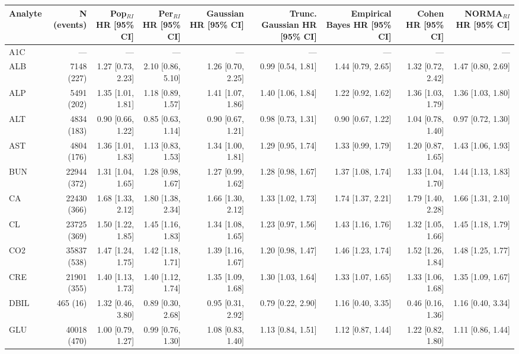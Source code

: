 \begin{table}[ht]
\centering
\footnotesize
\begin{tabular}{lrrrrrrrr}
\toprule
Analyte & N (events) & Pop$_{RI}$ HR [95\% CI] & Per$_{RI}$ HR [95\% CI] & Gaussian HR [95\% CI] & Trunc. Gaussian HR [95\% CI] & Empirical Bayes HR [95\% CI] & Cohen HR [95\% CI] & NORMA$_{RI}$ HR [95\% CI] \\
\midrule
A1C & --- & --- & --- & --- & --- & --- & --- & --- \\
ALB & 7148 (227) & 1.27 [0.73, 2.23] & 2.10 [0.86, 5.10] & 1.26 [0.70, 2.25] & 0.99 [0.54, 1.81] & 1.44 [0.79, 2.65] & 1.32 [0.72, 2.42] & 1.47 [0.80, 2.69] \\
ALP & 5491 (202) & 1.35 [1.01, 1.81] & 1.18 [0.89, 1.57] & 1.41 [1.07, 1.86] & 1.40 [1.06, 1.84] & 1.22 [0.92, 1.62] & 1.36 [1.03, 1.79] & 1.36 [1.03, 1.80] \\
ALT & 4834 (183) & 0.90 [0.66, 1.22] & 0.85 [0.63, 1.14] & 0.90 [0.67, 1.21] & 0.98 [0.73, 1.31] & 0.90 [0.67, 1.22] & 1.04 [0.78, 1.40] & 0.97 [0.72, 1.30] \\
AST & 4804 (176) & 1.36 [1.01, 1.83] & 1.13 [0.83, 1.53] & 1.34 [1.00, 1.81] & 1.29 [0.95, 1.74] & 1.33 [0.99, 1.79] & 1.20 [0.87, 1.65] & 1.43 [1.06, 1.93] \\
BUN & 22944 (372) & 1.31 [1.04, 1.65] & 1.28 [0.98, 1.67] & 1.27 [0.99, 1.62] & 1.28 [0.98, 1.67] & 1.37 [1.08, 1.74] & 1.33 [1.04, 1.70] & 1.44 [1.13, 1.83] \\
CA & 22430 (366) & 1.68 [1.33, 2.12] & 1.80 [1.38, 2.34] & 1.66 [1.30, 2.12] & 1.33 [1.02, 1.73] & 1.74 [1.37, 2.21] & 1.79 [1.40, 2.28] & 1.66 [1.31, 2.10] \\
CL & 23725 (369) & 1.50 [1.22, 1.85] & 1.45 [1.16, 1.83] & 1.34 [1.08, 1.65] & 1.23 [0.97, 1.56] & 1.43 [1.16, 1.76] & 1.32 [1.05, 1.66] & 1.45 [1.18, 1.79] \\
CO2 & 35837 (538) & 1.47 [1.24, 1.75] & 1.42 [1.18, 1.71] & 1.39 [1.16, 1.67] & 1.20 [0.98, 1.47] & 1.46 [1.23, 1.74] & 1.52 [1.26, 1.84] & 1.48 [1.25, 1.77] \\
CRE & 21901 (355) & 1.40 [1.13, 1.73] & 1.40 [1.12, 1.74] & 1.35 [1.09, 1.68] & 1.30 [1.03, 1.64] & 1.33 [1.07, 1.65] & 1.33 [1.06, 1.68] & 1.35 [1.09, 1.67] \\
DBIL & 465 (16) & 1.32 [0.46, 3.80] & 0.89 [0.30, 2.68] & 0.95 [0.31, 2.92] & 0.79 [0.22, 2.90] & 1.16 [0.40, 3.35] & 0.46 [0.16, 1.36] & 1.16 [0.40, 3.34] \\
GLU & 40018 (470) & 1.00 [0.79, 1.27] & 0.99 [0.76, 1.30] & 1.08 [0.83, 1.40] & 1.13 [0.84, 1.51] & 1.12 [0.87, 1.44] & 1.22 [0.82, 1.80] & 1.11 [0.86, 1.44] \\

\end{tabular}
\end{table}
